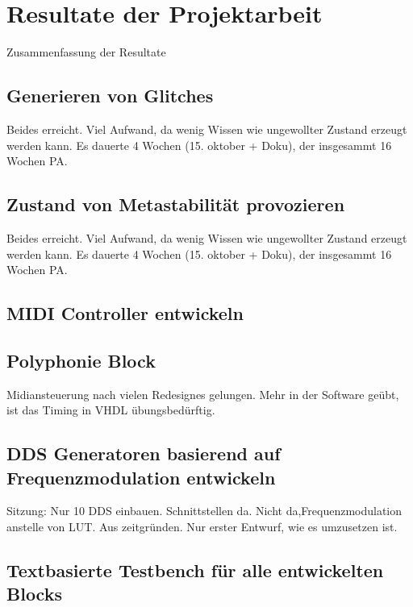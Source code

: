 
\chapter{Resultate der Projektarbeit}\label{chap.resultate}

Zusammenfassung der Resultate

\section{Generieren von Glitches}\label{sect.resultateGlitch}
Beides erreicht. Viel Aufwand, da wenig Wissen wie ungewollter Zustand erzeugt werden kann.
Es dauerte 4 Wochen (15. oktober + Doku), der insgesammt 16 Wochen PA.

\section{Zustand von Metastabilität provozieren}\label{sect.resultateMetastabilty}
Beides erreicht. Viel Aufwand, da wenig Wissen wie ungewollter Zustand erzeugt werden kann.
Es dauerte 4 Wochen (15. oktober + Doku), der insgesammt 16 Wochen PA.

\section{MIDI Controller entwickeln}\label{sect.resultateMidiControl}

\section{Polyphonie Block }\label{sect.resultatePolyphonie}
Midiansteuerung nach vielen Redesignes gelungen.
Mehr in der Software geübt, ist das Timing in VHDL übungsbedürftig.

\section{DDS Generatoren basierend auf Frequenzmodulation entwickeln}\label{sect.resultateFrequenzmodulation}
Sitzung: Nur 10 DDS einbauen.
Schnittstellen da.
Nicht da,Frequenzmodulation anstelle von LUT. Aus zeitgründen.
Nur erster Entwurf, wie es umzusetzen ist.
\section{Textbasierte Testbench für alle entwickelten Blocks}\label{sect.resultateTestbench}
 




